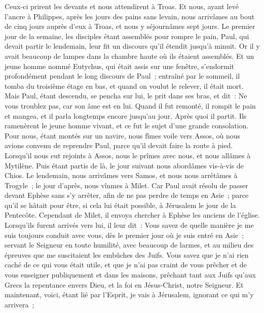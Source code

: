 \begin{multicols}{2}
Ceux-ci prirent les devants et nous attendirent à Troas.
Et nous, ayant levé l'ancre à Philippes, après les jours des pains sans levain, nous arrivâmes au bout de cinq jours auprès d'eux à Troas, et nous y séjournâmes sept jours.
Le premier jour de la semaine, les disciples étant assemblés pour rompre le pain, Paul, qui devait partir le lendemain, leur fit un discours qu'il étendit jusqu'à minuit.
Or il y avait beaucoup de lampes dans la chambre haute où ils étaient assemblés.
Et un jeune homme nommé Eutychus, qui était assis sur une fenêtre, s'endormit profondément pendant le long discours de Paul~; entraîné par le sommeil, il tomba du troisième étage en bas, et quand on voulut le relever, il était mort.
Mais Paul, étant descendu, se pencha sur lui, le prit dans ses bras, et dit~: Ne vous troublez pas, car son âme est en lui.
Quand il fut remonté, il rompit le pain et mangea, et il parla longtemps encore jusqu'au jour. Après quoi il partit.
Ils ramenèrent le jeune homme vivant, et ce fut le sujet d'une grande consolation.
Pour nous, étant montés sur un navire, nous fîmes voile vers Assos, où nous avions convenu de reprendre Paul, parce qu'il devait faire la route à pied.
Lorsqu'il nous eut rejoints à Assos, nous le prîmes avec nous, et nous allâmes à Mytilène.
Puis étant partis de là, le jour suivant nous abordâmes vis-à-vis de Chios. Le lendemain, nous arrivâmes vers Samos, et nous nous arrêtâmes à Trogyle~; le jour d'après, nous vînmes à Milet.
Car Paul avait résolu de passer devant Ephèse sans s'y arrêter, afin de ne pas perdre de temps en Asie~; parce qu'il se hâtait pour être, si cela lui était possible, à Jérusalem le jour de la Pentecôte.
Cependant de Milet, il envoya chercher à Ephèse les anciens de l'église.
Lorsqu'ils furent arrivés vers lui, il leur dit~: Vous savez de quelle manière je me suis toujours conduit avec vous, dès le premier jour où je suis entré en Asie~;
servant le Seigneur en toute humilité, avec beaucoup de larmes, et au milieu des épreuves que me suscitaient les embûches des Juifs.
Vous savez que je n'ai rien caché de ce qui vous était utile, et que je n'ai pas craint de vous prêcher et de vous enseigner publiquement et dans les maisons,
prêchant tant aux Juifs qu'aux Grecs la repentance envers Dieu, et la foi en Jésus-Christ, notre Seigneur.
Et maintenant, voici, étant lié par l'Esprit, je vais à Jérusalem, ignorant ce qui m'y arrivera~;

\end{multicols}
